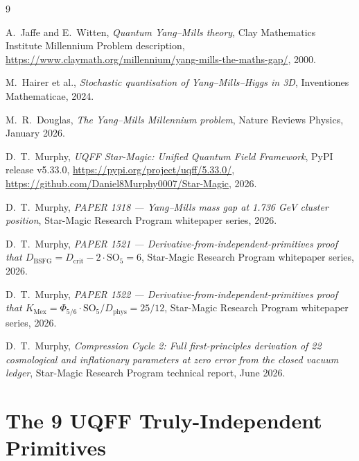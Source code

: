 \documentclass[11pt,a4paper,onecolumn]{article}
\theoremstyle{plain}
\theoremstyle{definition}
\theoremstyle{remark}
\begin{document}
\begin{thebibliography}{9}

A.~Jaffe and E.~Witten,
\textit{Quantum Yang--Mills theory},
Clay Mathematics Institute Millennium Problem description,
\url{https://www.claymath.org/millennium/yang-mills-the-maths-gap/},
2000.

M.~Hairer et al.,
\textit{Stochastic quantisation of Yang--Mills--Higgs in 3D},
Inventiones Mathematicae, 2024.

M.~R.~Douglas,
\textit{The Yang--Mills Millennium problem},
Nature Reviews Physics, January 2026.

D.~T.~Murphy,
\textit{UQFF Star-Magic: Unified Quantum Field Framework},
PyPI release v5.33.0,
\url{https://pypi.org/project/uqff/5.33.0/},
\url{https://github.com/Daniel8Murphy0007/Star-Magic},
2026.

D.~T.~Murphy,
\textit{PAPER 1318 --- Yang--Mills mass gap at 1.736 GeV cluster
position},
Star-Magic Research Program whitepaper series, 2026.

D.~T.~Murphy,
\textit{PAPER 1521 --- Derivative-from-independent-primitives proof
that $D_{\mathrm{BSFG}} = D_{\mathrm{crit}} - 2 \cdot \mathrm{SO}_5 = 6$},
Star-Magic Research Program whitepaper series, 2026.

D.~T.~Murphy,
\textit{PAPER 1522 --- Derivative-from-independent-primitives proof
that $K_{\mathrm{Mex}} = \Phi_{5/6} \cdot \mathrm{SO}_5 / D_{\mathrm{phys}} = 25/12$},
Star-Magic Research Program whitepaper series, 2026.

D.~T.~Murphy,
\textit{Compression Cycle 2: Full first-principles derivation of 22
cosmological and inflationary parameters at zero error from the closed
vacuum ledger},
Star-Magic Research Program technical report, June 2026.


\end{thebibliography}


\appendix

\section{The 9 UQFF Truly-Independent Primitives}\label{app:primitives}
\end{document}
